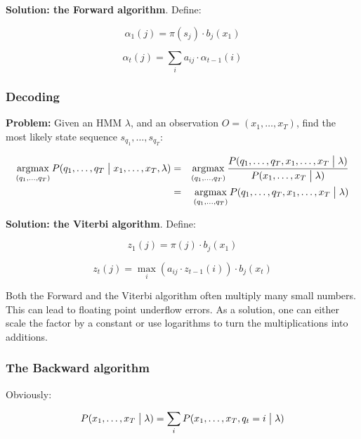 \textbf{Solution: the Forward algorithm}. Define:

\begin{equation}
    \alpha_1(j) = \pi(s_j) \cdot b_j(x_1)
\end{equation}

\begin{equation}
    \alpha_t(j) = \sum\limits_i a_{ij} \cdot \alpha_{t-1}(i)
\end{equation}

\subsubsection{Decoding}

\textbf{Problem:} Given an HMM $\lambda$, and an observation $O = (x_1, \ldots, x_T)$, find the most likely state sequence $s_{q_1}, \ldots, s_{q_T}$:

\begin{eqnarray*}
    \operatorname*{\arg\!\max}_{(q_1, \ldots, q_T)} P(q_1, \ldots, q_T \bigm| x_1, \ldots, x_T, \lambda)
    &=& \operatorname*{\arg\!\max}_{(q_1, \ldots, q_T)} \frac{P(q_1, \ldots, q_T, x_1, \ldots, x_T \bigm| \lambda)}{P(x_1, \ldots, x_T \bigm| \lambda)} \\
    &=& \operatorname*{\arg\!\max}_{(q_1, \ldots, q_T)} P(q_1, \ldots, q_T, x_1, \ldots, x_T \bigm| \lambda)
\end{eqnarray*}

\textbf{Solution: the Viterbi algorithm}. Define:

\begin{equation}
    z_1(j) = \pi(j) \cdot b_j(x_1)
\end{equation}

\begin{equation}
    z_t(j) = \max_i(a_{ij} \cdot z_{t-1}(i)) \cdot b_j(x_t)
\end{equation}

Both the Forward and the Viterbi algorithm often multiply many small numbers. This can lead to floating point underflow errors. As a solution, one can either scale the factor by a constant or use logarithms to turn the multiplications into additions.

\subsubsection{The Backward algorithm}

Obviously:

\begin{equation}
    P(x_1, \ldots, x_T \bigm| \lambda) = \sum\limits_i P(x_1, \ldots, x_T, q_t = i \bigm| \lambda)
\end{equation}

